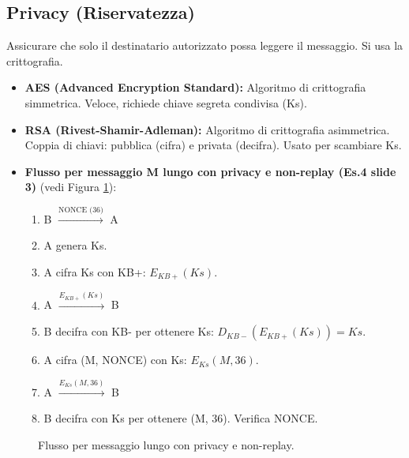 \documentclass{article}
\begin{document}
\subsection{Privacy (Riservatezza)}
Assicurare che solo il destinatario autorizzato possa leggere il messaggio. Si usa la crittografia.
\begin{itemize}
    \item \textbf{AES (Advanced Encryption Standard):} Algoritmo di crittografia simmetrica. Veloce, richiede chiave segreta condivisa (Ks).
    \item \textbf{RSA (Rivest-Shamir-Adleman):} Algoritmo di crittografia asimmetrica. Coppia di chiavi: pubblica (cifra) e privata (decifra). Usato per scambiare Ks.
    \item \textbf{Flusso per messaggio M lungo con privacy e non-replay (Es.4 slide 3)} (vedi Figura \ref{fig:privacy_flow}):
    \begin{enumerate}
        \item B $\xrightarrow{\text{NONCE (36)}}$ A
        \item A genera Ks.
        \item A cifra Ks con KB+: $E_{KB+}(Ks)$.
        \item A $\xrightarrow{E_{KB+}(Ks)}$ B
        \item B decifra con KB- per ottenere Ks: $D_{KB-}(E_{KB+}(Ks)) = Ks$.
        \item A cifra (M, NONCE) con Ks: $E_{Ks}(M, 36)$.
        \item A $\xrightarrow{E_{Ks}(M, 36)}$ B
        \item B decifra con Ks per ottenere (M, 36). Verifica NONCE.
    \end{enumerate}
\end{itemize}

\begin{figure}[H]
\centering
{}
\caption{Flusso per messaggio lungo con privacy e non-replay.}
\label{fig:privacy_flow}
\end{figure}
\end{document}
